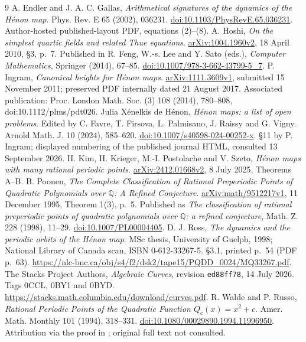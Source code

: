 \documentclass{jT}
\newcommand{\Q}{\mathbb Q}
\begin{document}
\begin{thebibliography}{9}
 A. Endler and J. A. C. Gallas, \emph{Arithmetical signatures of the dynamics of the H\'enon map}. Phys. Rev. E 65 (2002), 036231. \href{https://doi.org/10.1103/PhysRevE.65.036231}{doi:10.1103/PhysRevE.65.036231}. Author-hosted published-layout PDF, equations (2)--(8).
 A. Hoshi, \emph{On the simplest quartic fields and related Thue equations}. \href{https://arxiv.org/abs/1004.1960v2}{arXiv:1004.1960v2}, 18 April 2010, \S3, p.~7. Published in R. Feng, W.-s. Lee and Y. Sato (eds.), \emph{Computer Mathematics}, Springer (2014), 67--85. \href{https://doi.org/10.1007/978-3-662-43799-5_7}{doi:10.1007/978-3-662-43799-5\_7}.
 P. Ingram, \emph{Canonical heights for H\'enon maps}. \href{https://arxiv.org/abs/1111.3609v1}{arXiv:1111.3609v1}, submitted 15 November 2011; preserved PDF internally dated 21 August 2017. Associated publication: Proc. London Math. Soc. (3) 108 (2014), 780--808, doi:10.1112/plms/pdt026.
 Julia X\'enelkis de H\'enon, \emph{H\'enon maps: a list of open problems}. Edited by C. Favre, T. Firsova, L. Palmisano, J. Raissy and G. Vigny. Arnold Math. J. 10 (2024), 585--620. \href{https://doi.org/10.1007/s40598-024-00252-x}{doi:10.1007/s40598-024-00252-x}. \S11 by P. Ingram; displayed numbering of the published journal HTML, consulted 13 September 2026.
 H. Kim, H. Krieger, M.-I. Postolache and V. Szeto, \emph{H\'enon maps with many rational periodic points}. \href{https://arxiv.org/abs/2412.01668v2}{arXiv:2412.01668v2}, 8 July 2025, Theorems A--B.
 B. Poonen, \emph{The Complete Classification of Rational Preperiodic Points of Quadratic Polynomials over $\Q$: A Refined Conjecture}. \href{https://arxiv.org/abs/math/9512217v1}{arXiv:math/9512217v1}, 11 December 1995, Theorem 1(3), p.~5. Published as \emph{The classification of rational preperiodic points of quadratic polynomials over $\Q$: a refined conjecture}, Math. Z. 228 (1998), 11--29. \href{https://doi.org/10.1007/PL00004405}{doi:10.1007/PL00004405}.
 D. J. Ross, \emph{The dynamics and the periodic orbits of the H\'enon map}. MSc thesis, University of Guelph, 1998; National Library of Canada scan, ISBN 0-612-33267-5. \S3.1, printed p.~54 (PDF p.~63). \url{https://nlc-bnc.ca/obj/s4/f2/dsk2/tape15/PQDD_0024/MQ33267.pdf}.
 The Stacks Project Authors, \emph{Algebraic Curves}, revision \texttt{ed88ff78}, 14 July 2026. Tags 0CCL, 0BY1 and 0BYD. \url{https://stacks.math.columbia.edu/download/curves.pdf}.
 R. Walde and P. Russo, \emph{Rational Periodic Points of the Quadratic Function $Q_c(x)=x^2+c$}. Amer. Math. Monthly 101 (1994), 318--331. \href{https://doi.org/10.1080/00029890.1994.11996950}{doi:10.1080/00029890.1994.11996950}. Attribution via the proof in \cite{poonen}; original full text not consulted.
\end{thebibliography}
\end{document}

